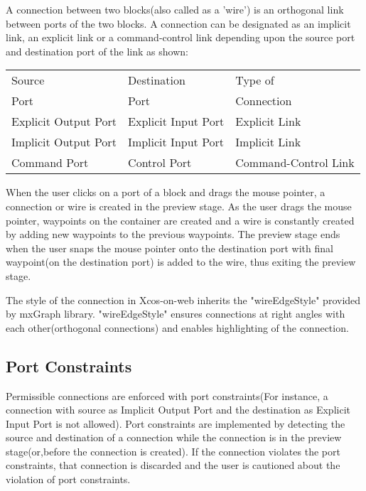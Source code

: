 \documentclass[conference]{IEEEtran}
\begin{document}
A connection between two blocks(also called as a 'wire') is an orthogonal link between ports of the two blocks. A connection can be designated as an implicit link, an explicit link or a command-control link depending upon the source port and destination port of the link as shown:

\begin{center}
\begin{tabu} to 0.4\textwidth { | X[c] | X[c] | X[c] | }
 \hline
 Source & Destination & Type of\\ [0.5ex]
 Port & Port & Connection\\ [0.5ex]
 \hline\hline
 Explicit Output Port & Explicit Input Port & Explicit Link \\ 
 \hline
 Implicit Output Port & Implicit Input Port & Implicit Link \\ 
 \hline
 Command Port & Control Port & Command-Control Link  \\ 
 \hline
\end{tabu}
\end{center}

When the user clicks on a port of a block and drags the mouse pointer, a connection or wire is created in the preview stage. As the user drags the mouse pointer, waypoints on the container are created and a wire is constantly created by adding new waypoints to the previous waypoints.
The preview stage ends when the user snaps the mouse pointer onto the destination port with final waypoint(on the destination port) is added to the wire, thus exiting the preview stage.

The style of the connection in Xcos-on-web inherits the "wireEdgeStyle" provided by mxGraph library. "wireEdgeStyle" ensures connections at right angles with each other(orthogonal connections) and enables highlighting of the connection.

\subsection{Port Constraints}
Permissible connections are enforced with port constraints(For instance, a connection with source as Implicit Output Port and the destination as Explicit Input Port is not allowed). Port constraints are implemented by detecting the source and destination of a connection while the connection is in the preview stage(or,before the connection is created). If the connection violates the port constraints, that connection is discarded and the user is cautioned about the violation of port constraints.
\end{document}
